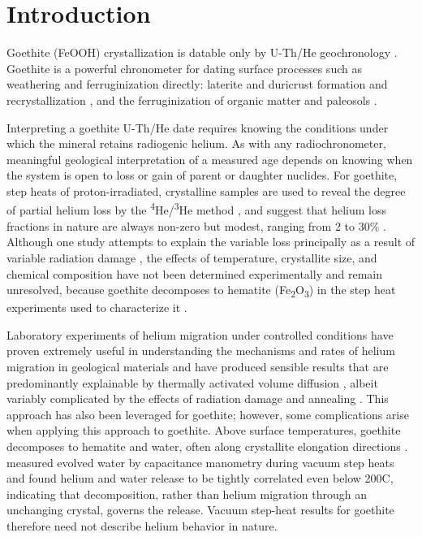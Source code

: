 
\section{Introduction}\label{introduction}

Goethite (FeOOH) crystallization is datable only by U-Th/He
geochronology \citep{shustervasconcelos2005,farley2024}. Goethite is a
powerful chronometer for dating surface processes such as weathering and
ferruginization directly: laterite and duricrust formation and
recrystallization \citep{monteiro2014,allard2018,ansart2022}, and the
ferruginization of organic matter and paleosols \citep{heim2006,yappshuster2011,vasconcelos2013,danisik2013,hofmann2017}.

Interpreting a goethite U-Th/He date requires knowing the conditions
under which the mineral retains radiogenic helium. As with any
radiochronometer, meaningful geological interpretation of a measured age
depends on knowing when the system is open to loss or gain of parent or
daughter nuclides. For goethite, step heats of proton-irradiated,
crystalline samples are used to reveal the degree of partial helium loss
by the \textsuperscript{4}He/\textsuperscript{3}He method \citep{shustervasconcelos2005}, and suggest that
helium loss fractions in nature are always non-zero but modest, ranging
from 2 to 30\% \citep{shustervasconcelos2005,heim2006,hofmann2017,deng2017}.
Although one study attempts to explain the variable loss principally as a
result of variable radiation damage \citep{bassal2022}, the effects of
temperature, crystallite size, and chemical composition have not been
determined experimentally and remain unresolved, because goethite
decomposes to hematite (Fe\textsubscript{2}O\textsubscript{3}) in the step
heat experiments used to characterize it \citep{farley2024}.

Laboratory experiments of helium migration under controlled conditions
have proven extremely useful in understanding the mechanisms and rates
of helium migration in geological materials and have produced sensible
results that are predominantly explainable by thermally activated volume
diffusion \citep{reinersfarley1999,farley2000,farley2007,cherniakwatson2011,farley2018}, albeit variably complicated by
the effects of radiation damage and annealing \citep{shuster2006,guenthner2013}. This approach has also been leveraged for
goethite; however, some complications arise when applying this approach
to goethite. Above surface temperatures, goethite decomposes to hematite
and water, often along crystallite elongation directions \citep{goss1987}.
\citet{farley2024} measured evolved water by capacitance manometry during
vacuum step heats and found helium and water release to be tightly
correlated even below 200\textdegree C, indicating that decomposition,
rather than helium migration through an unchanging crystal, governs the
release. Vacuum step-heat results for goethite therefore need not describe
helium behavior in nature.

